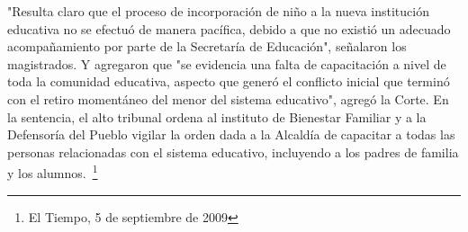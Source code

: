 \documentclass[10pt,twoside]{article}
\begin{document}
"Resulta claro que el proceso de incorporación de niño a la nueva institución
educativa no se efectuó de manera pacífica, debido a que no existió un adecuado acompañamiento por parte de la Secretaría de Educación", señalaron los magistrados. Y agregaron que "se evidencia una falta de capacitación a nivel de toda la comunidad educativa, aspecto que generó el conflicto inicial que terminó con el retiro momentáneo del menor del sistema educativo", agregó la Corte. En la sentencia, el alto tribunal ordena al instituto de Bienestar Familiar y a la Defensoría del Pueblo vigilar la orden dada a la Alcaldía de capacitar a todas las personas relacionadas con el sistema educativo, incluyendo a los padres de familia y los alumnos.~\footnote{El Tiempo, 5 de septiembre de 2009}
\end{document}
